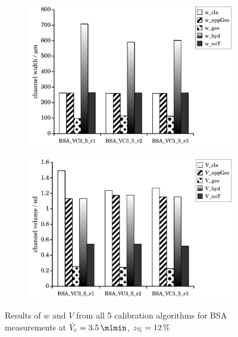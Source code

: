 \begin{figure}[htp]
  \begin{center}
    \begin{subfigure}{\subFigSize}
      \includegraphics[width=\linewidth]{./images/data/eval_own_p12/calibW_BSA_VC_3_5_p12.pdf}
      \label{subfig:calibRes_BSA_VC3_5_w}
    \end{subfigure}
    \begin{subfigure}{\subFigSize}
      \includegraphics[width=\linewidth]{./images/data/eval_own_p12/calibV_BSA_VC_3_5_p12.pdf}
    \end{subfigure}
  \end{center}
  \vspace*{-4ex}    
  \caption[Results of $w$ and $V$ from all 5 calibration algorithms for BSA measurements at
  $\Vc = \SI{3.5}{\mlmin}$, $\zP = \SI{12}{\percent}$]{
    Results of $w$ and $V$ from all 5 calibration algorithms for BSA measurements at
    $\Vc = \SI{3.5}{\mlmin}$, $\zP = \SI{12}{\percent}$
  }
  \label{fig:calibRes_BSA_VC3_5}
\end{figure}
